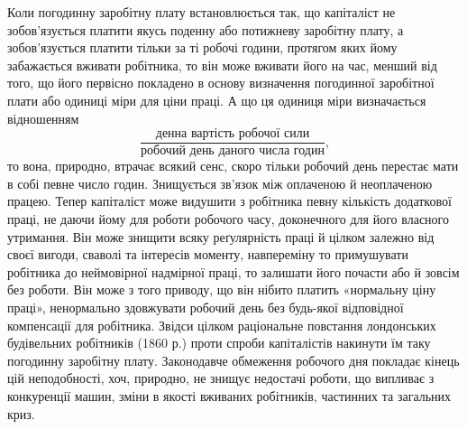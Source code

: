 Коли погодинну заробітну плату встановлюється так, що
капіталіст не зобов’язується платити якусь поденну або потижневу
заробітну плату, а зобов’язується платити тільки за ті
робочі години, протягом яких йому забажається вживати робітника,
то він може вживати його на час, менший від того, що його
первісно покладено в основу визначення погодинної заробітної
плати або одиниці міри для ціни праці. А що ця одиниця міри
визначається відношенням\[
\frac{\text{денна вартість робочої сили}}{\text{робочий день даного числа годин}}
\text{,}
\]
\noindent{}то вона, природно, втрачає всякий сенс, скоро тільки робочий
день перестає мати в собі певне число годин. Знищується зв’язок
між оплаченою й неоплаченою працею. Тепер капіталіст може
видушити з робітника певну кількість додаткової праці, не даючи
йому для роботи робочого часу, доконечного для його власного
утримання. Він може знищити всяку реґулярність праці й цілком
залежно від своєї вигоди, сваволі та інтересів моменту, навпереміну
то примушувати робітника до неймовірної надмірної
праці, то залишати його почасти або й зовсім без роботи. Він
може з того приводу, що він нібито платить «нормальну ціну
праці», ненормально здовжувати робочий день без будь-якої відповідної
компенсації для робітника. Звідси цілком раціональне
повстання лондонських будівельних робітників (1860 р.) проти
спроби капіталістів накинути їм таку погодинну заробітну плату.
Законодавче обмеження робочого дня покладає кінець цій неподобності,
хоч, природно, не знищує недостачі роботи, що випливає
з конкуренції машин, зміни в якості вживаних робітників,
частинних та загальних криз.

